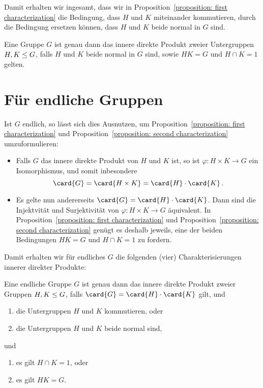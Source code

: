 Damit erhalten wir ingesamt, dass wir in Proposition~\ref{proposition: first characterization} die Bedingung, dass $H$ und $K$ miteinander kommutieren, durch die Bedingung ersetzen können, dass $H$ und $K$ beide normal in $G$ sind.

\begin{proposition}
  \label{proposition: second characterization}
  Eine Gruppe $G$ ist genau dann das innere direkte Produkt zweier Untergruppen $H, K \leq G$, falls $H$ und $K$ beide normal in $G$ sind, sowie $HK = G$ und $H \cap K = 1$ gelten.
\end{proposition}





\section{Für endliche Gruppen}

Ist $G$ endlich, so lässt sich dies Ausnutzen, um Proposition~\ref{proposition: first characterization} und Proposition~\ref{proposition: second characterization} umzuformulieren:

\begin{itemize}
  \item
    Falls $G$ das innere direkte Produkt von $H$ und $K$ ist, so ist $\varphi \colon H \times K \to G$ ein Isomorphismus, und somit inbesondere
    \[
        \card{G}
      = \card{H \times K}
      = \card{H} \cdot \card{K} \,.
    \]
  \item
    Es gelte nun andererseits $\card{G} = \card{H} \cdot \card{K}$.
    Dann sind die Injektvität und Surjektivität von $\varphi \colon H \times K \to G$ äquivalent.
    In Proposition~\ref{proposition: first characterization} und Proposition~\ref{proposition: second characterization} genügt es deshalb jeweils, eine der beiden Bedingungen $HK = G$ und $H \cap K = 1$ zu fordern.
\end{itemize}

Damit erhalten wir für endliches $G$ die folgenden (vier) Charakterisierungen innerer direkter Produkte:

\begin{proposition}
  Eine endliche Gruppe $G$ ist genau dann das innere direkte Produkt zweier Gruppen $H, K \leq G$, falls $\card{G} = \card{H} \cdot \card{K}$ gilt, und
  \begin{enumerate}
    \item
      die Untergruppen $H$ und $K$ kommutieren, oder
    \item
      die Untergruppen $H$ und $K$ beide normal sind,
  \end{enumerate}
  und
  \begin{enumerate}[label=\arabic*'.]
    \item
      es gilt $H \cap K = 1$, oder
    \item
      es gilt $H K = G$.
  \end{enumerate}
\end{proposition}

